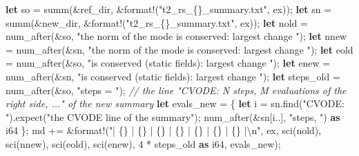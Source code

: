 \documentclass[
  10pt,
]{article}
\newenvironment{Shaded}{}{}
\newcommand{\CommentTok}[1]{\textcolor[rgb]{0.38,0.63,0.69}{\textit{#1}}}
\newcommand{\DataTypeTok}[1]{\textcolor[rgb]{0.56,0.13,0.00}{#1}}
\newcommand{\DecValTok}[1]{\textcolor[rgb]{0.25,0.63,0.44}{#1}}
\newcommand{\KeywordTok}[1]{\textcolor[rgb]{0.00,0.44,0.13}{\textbf{#1}}}
\newcommand{\NormalTok}[1]{#1}
\newcommand{\OperatorTok}[1]{\textcolor[rgb]{0.40,0.40,0.40}{#1}}
\newcommand{\PreprocessorTok}[1]{\textcolor[rgb]{0.74,0.48,0.00}{#1}}
\newcommand{\SpecialCharTok}[1]{\textcolor[rgb]{0.25,0.44,0.63}{#1}}
\newcommand{\StringTok}[1]{\textcolor[rgb]{0.25,0.44,0.63}{#1}}
\begin{document}
\begin{Shaded}
\begin{Highlighting}[]
        \KeywordTok{let}\NormalTok{ so }\OperatorTok{=}\NormalTok{ summ(}\OperatorTok{\&}\NormalTok{ref\_dir}\OperatorTok{,} \OperatorTok{\&}\PreprocessorTok{format!}\NormalTok{(}\StringTok{"t2\_rs\_\{\}\_summary.txt"}\OperatorTok{,}\NormalTok{ ex))}\OperatorTok{;}
        \KeywordTok{let}\NormalTok{ sn }\OperatorTok{=}\NormalTok{ summ(}\OperatorTok{\&}\NormalTok{new\_dir}\OperatorTok{,} \OperatorTok{\&}\PreprocessorTok{format!}\NormalTok{(}\StringTok{"t2\_rs\_\{\}\_summary.txt"}\OperatorTok{,}\NormalTok{ ex))}\OperatorTok{;}
        \KeywordTok{let}\NormalTok{ nold }\OperatorTok{=}\NormalTok{ num\_after(}\OperatorTok{\&}\NormalTok{so}\OperatorTok{,} \StringTok{"the norm of the mode is conserved: largest change "}\NormalTok{)}\OperatorTok{;}
        \KeywordTok{let}\NormalTok{ nnew }\OperatorTok{=}\NormalTok{ num\_after(}\OperatorTok{\&}\NormalTok{sn}\OperatorTok{,} \StringTok{"the norm of the mode is conserved: largest change "}\NormalTok{)}\OperatorTok{;}
        \KeywordTok{let}\NormalTok{ eold }\OperatorTok{=}\NormalTok{ num\_after(}\OperatorTok{\&}\NormalTok{so}\OperatorTok{,} \StringTok{"is conserved (static fields): largest change "}\NormalTok{)}\OperatorTok{;}
        \KeywordTok{let}\NormalTok{ enew }\OperatorTok{=}\NormalTok{ num\_after(}\OperatorTok{\&}\NormalTok{sn}\OperatorTok{,} \StringTok{"is conserved (static fields): largest change "}\NormalTok{)}\OperatorTok{;}
        \KeywordTok{let}\NormalTok{ steps\_old }\OperatorTok{=}\NormalTok{ num\_after(}\OperatorTok{\&}\NormalTok{so}\OperatorTok{,} \StringTok{"steps = "}\NormalTok{)}\OperatorTok{;}
        \CommentTok{// the line "CVODE: N steps, M evaluations of the right side, ..." of the new summary}
        \KeywordTok{let}\NormalTok{ evals\_new }\OperatorTok{=} \OperatorTok{\{}
            \KeywordTok{let}\NormalTok{ i }\OperatorTok{=}\NormalTok{ sn}\OperatorTok{.}\NormalTok{find(}\StringTok{"CVODE: "}\NormalTok{)}\OperatorTok{.}\NormalTok{expect(}\StringTok{"the CVODE line of the summary"}\NormalTok{)}\OperatorTok{;}
\NormalTok{            num\_after(}\OperatorTok{\&}\NormalTok{sn[i}\OperatorTok{..}\NormalTok{]}\OperatorTok{,} \StringTok{"steps, "}\NormalTok{) }\KeywordTok{as} \DataTypeTok{i64}
        \OperatorTok{\};}
\NormalTok{        md }\OperatorTok{+=} \OperatorTok{\&}\PreprocessorTok{format!}\NormalTok{(}\StringTok{"| \{\} | \{\} | \{\} | \{\} | \{\} | \{\} | \{\} |}\SpecialCharTok{\textbackslash{}n}\StringTok{"}\OperatorTok{,}\NormalTok{ ex}\OperatorTok{,}\NormalTok{ sci(nold)}\OperatorTok{,}\NormalTok{ sci(nnew)}\OperatorTok{,}\NormalTok{ sci(eold)}\OperatorTok{,}\NormalTok{ sci(enew)}\OperatorTok{,} \DecValTok{4} \OperatorTok{*}\NormalTok{ steps\_old }\KeywordTok{as} \DataTypeTok{i64}\OperatorTok{,}\NormalTok{ evals\_new)}\OperatorTok{;}

\end{Highlighting}
\end{Shaded}
\end{document}
